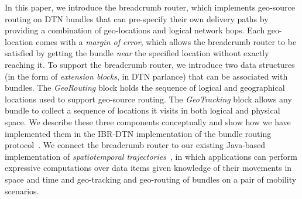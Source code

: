 In this paper, we introduce the {\sc breadcrumb} router, which implements geo-source routing on DTN bundles that can pre-specify their own delivery paths by providing a combination of geo-locations and logical network hops. 
Each geo-location comes with a {\em margin of error}, which allows the {\sc breadcrumb} router to be satisfied by getting the bundle {\em near} the specified location without exactly reaching it. To support the {\sc breadcrumb} router, we introduce two data structures (in the form of {\em extension blocks}, in DTN parlance) that can be associated with bundles. The {\em GeoRouting} block holds the sequence of logical and geographical locations used to support geo-source routing. The {\em GeoTracking} block allows any bundle to collect a sequence of locations it visits in both logical and physical space. We describe these three components conceptually and show how we have implemented them in the IBR-DTN implementation of the bundle routing protocol~\cite{IBR-DTN-WASA}. We connect the {\sc breadcrumb} router to our existing Java-based implementation of {\em spatiotemporal trajectories}~\cite{michel12:spatiotemporal}, in which applications can perform expressive computations over data items given knowledge of their movements in space and time and geo-tracking and geo-routing of bundles on a pair of mobility scenarios.





